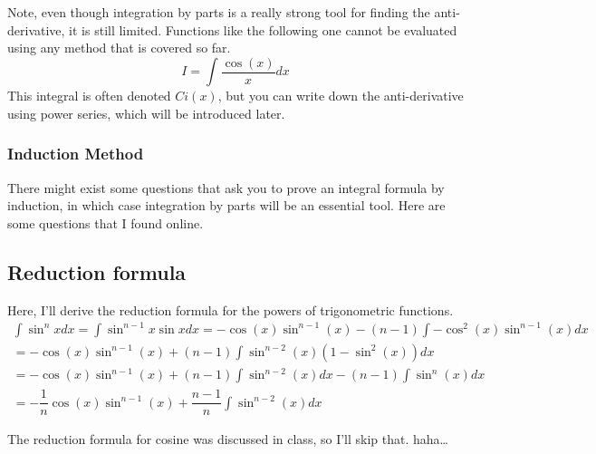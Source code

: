 \documentclass{article}
\theoremstyle{definition}
\theoremstyle{definition}
\theoremstyle{definition}
\theoremstyle{definition}
\theoremstyle{definition}
\theoremstyle{definition}
\theoremstyle{definition}
\theoremstyle{definition}
\theoremstyle{definition}
\begin{document}
Note, even though integration by parts is a really strong tool for finding the anti-derivative, it is still limited. Functions like the following one cannot be evaluated using any method that is covered so far.
\[I=\int\dfrac{\cos(x)}{x}dx\]
This integral is often denoted $Ci(x)$, but you can write down the anti-derivative using power series, which will be introduced later.

\subsubsection{Induction Method}
There might exist some questions that ask you to prove an integral formula by induction, in which case integration by parts will be an essential tool. Here are some questions that I found online.
\subsection{Reduction formula}
Here, I'll derive the reduction formula for the powers of trigonometric functions.
\begin{align*}
    \int\sin^nxdx=\int\sin^{n-1}x\sin xdx=-\cos(x)\sin^{n-1}(x)-(n-1)\int-\cos^2(x)\sin^{n-1}(x)dx\\
    = -\cos(x)\sin^{n-1}(x)+(n-1)\int\sin^{n-2}(x)(1-\sin^2(x))dx\\
    = -\cos(x)\sin^{n-1}(x)+(n-1)\int\sin^{n-2}(x)dx-(n-1)\int\sin^n(x)dx\\
    = -\dfrac{1}{n}\cos(x)\sin^{n-1}(x)+\dfrac{n-1}{n}\int\sin^{n-2}(x)dx
\end{align*}

The reduction formula for cosine was discussed in class, so I'll skip that. haha\dots
\end{document}
